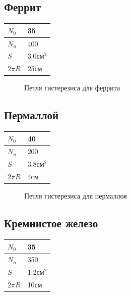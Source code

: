 \documentclass[a4paper,12pt]{article}
\begin{document}
\subsection{Феррит}
\begin{minipage}{0.4\textwidth}
\begin{tabular}{|l|l|}
\hline
$N_0$ & 35        \\ \hline
$N_u$ & 400       \\ \hline
$S$   & 3.0см$^2$ \\ \hline
$2\pi R$ & 25см \\ \hline
\end{tabular}
\end{minipage}

\begin{figure}[H]
  \centering
  
  \caption{Петля гистерезиса для феррита}
  \label{fig:ferrit}
\end{figure}

\subsection{Пермаллой}
\begin{minipage}{0.4\textwidth}
\begin{tabular}{|l|l|}
\hline
$N_0$ & 40        \\ \hline
$N_u$ & 200       \\ \hline
$S$   & 3.8см$^2$ \\ \hline
$2\pi R$ & 4см \\ \hline
\end{tabular}
\end{minipage}


\begin{figure}[H]
  \centering
  
  \caption{Петля гистерезиса для пермаллоя}
  \label{fig:parmalloy}
\end{figure}

\subsection{Кремнистое железо}
\begin{minipage}{0.4\textwidth}
\begin{tabular}{|l|l|}
\hline
$N_0$ & 35        \\ \hline
$N_u$ & 350       \\ \hline
$S$   & 1.2см$^2$ \\ \hline
$2\pi R$ & 10см \\ \hline
\end{tabular}
\end{minipage}
\end{document}
